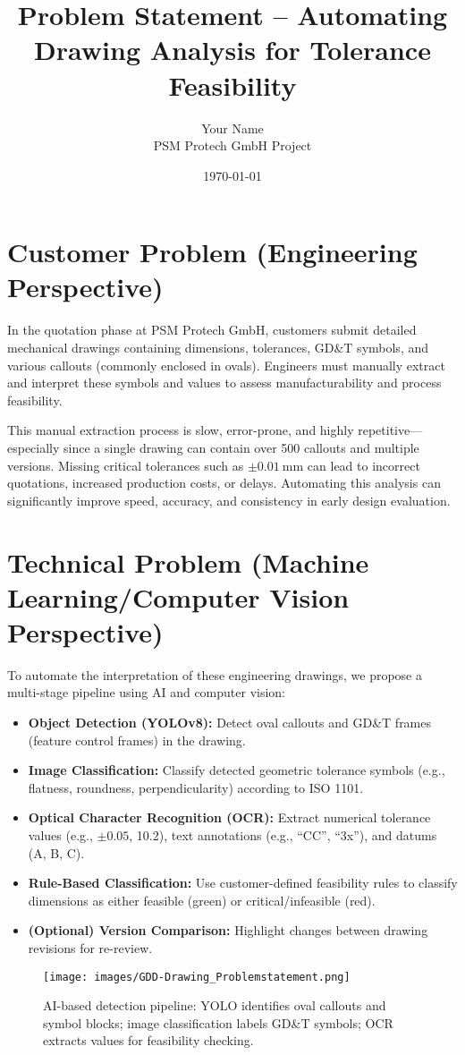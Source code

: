 \documentclass[a4paper,12pt]{article}
\title{\textbf{Problem Statement -- Automating Drawing Analysis for Tolerance Feasibility}}
\author{Your Name \\ PSM Protech GmbH Project}
\date{\today}
\begin{document}
\maketitle

\section*{Customer Problem (Engineering Perspective)}

In the quotation phase at PSM Protech GmbH, customers submit detailed mechanical drawings containing dimensions, tolerances, GD\&T symbols, and various callouts (commonly enclosed in ovals). Engineers must manually extract and interpret these symbols and values to assess manufacturability and process feasibility.

This manual extraction process is slow, error-prone, and highly repetitive---especially since a single drawing can contain over 500 callouts and multiple versions. Missing critical tolerances such as $\pm 0.01~\text{mm}$ can lead to incorrect quotations, increased production costs, or delays. Automating this analysis can significantly improve speed, accuracy, and consistency in early design evaluation.

\section*{Technical Problem (Machine Learning/Computer Vision Perspective)}

To automate the interpretation of these engineering drawings, we propose a multi-stage pipeline using AI and computer vision:

\begin{itemize}
  \item \textbf{Object Detection (YOLOv8):} Detect oval callouts and GD\&T frames (feature control frames) in the drawing.
  \item \textbf{Image Classification:} Classify detected geometric tolerance symbols (e.g., flatness, roundness, perpendicularity) according to ISO 1101.
  \item \textbf{Optical Character Recognition (OCR):} Extract numerical tolerance values (e.g., $\pm 0.05$, 10.2), text annotations (e.g., ``CC'', ``3x''), and datums (A, B, C).
  \item \textbf{Rule-Based Classification:} Use customer-defined feasibility rules to classify dimensions as either feasible (green) or critical/infeasible (red).
  \item \textbf{(Optional) Version Comparison:} Highlight changes between drawing revisions for re-review.
\end{itemize}

\begin{figure}[h!]
  \centering
  \texttt{[image: images/GDD-Drawing\_Problemstatement.png]} %
  \caption{AI-based detection pipeline: YOLO identifies oval callouts and symbol blocks; image classification labels GD\&T symbols; OCR extracts values for feasibility checking.}
  \label{fig:pipeline_example}
\end{figure}
\end{document}
